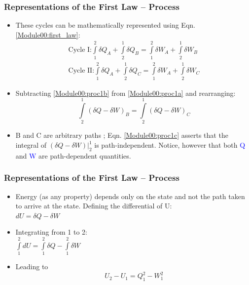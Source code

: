 \documentclass[10pt,compress]{beamer}
\begin{document}
\begin{frame}
 \frametitle{Representations of the First Law -- Process}
   \begin{itemize}
    \item <1-> These cycles can be mathematically represented using Eqn. \ref{Module00:first_law}:
   \begin{eqnarray}
    \text{Cycle I:}  \int\limits_{1}^{2}\delta Q_{A} + \int\limits_{2}^{1}\delta Q_{B} = \int\limits_{1}^{2}\delta W_{A} + \int\limits_{2}^{1}\delta W_{B}  \label{Module00:proc1a}\\
    \text{Cycle II:} \int\limits_{1}^{2}\delta Q_{A} + \int\limits_{2}^{1}\delta Q_{C} = \int\limits_{1}^{2}\delta W_{A} + \int\limits_{2}^{1}\delta W_{C}  \label{Module00:proc1b}
   \end{eqnarray}
   \item <2-> Subtracting \ref{Module00:proc1b} from \ref{Module00:proc1a} and rearranging:
   \begin{equation}
    \int\limits_{2}^{1}\left(\delta Q- \delta W\right)_{B} = \int\limits_{2}^{1}\left(\delta Q- \delta W\right)_{C}\label{Module00:proc1c}
   \end{equation}
   \item <3-> B and C are arbitrary paths ; Eqn. \ref{Module00:proc1c} asserts that the integral of $\left(\delta Q -\delta W\right)\left.\right|_{2}^{1}$ is path-independent. Notice, however that both \textcolor{blue}{Q} and \textcolor{blue}{W} are path-dependent quantities. 
    \end{itemize}
\end{frame}



\begin{frame}
 \frametitle{Representations of the First Law -- Process}

  \begin{itemize}
   \item <1-> Energy (as any property) depends only on the state and not the path taken to arrive at the state. Defining the differential of U:\\
    $dU =\delta Q - \delta W$\\ 
   
   \item <2-> Integrating from 1 to 2:\\
    $\displaystyle\int\limits_{1}^{2}dU =\displaystyle\int\limits_{1}^{2}\delta Q - \displaystyle\int\limits_{1}^{2}\delta W$\\ 

   \item <3-> Leading to
   \begin{equation}
    U_{2} - U_{1} = Q_{1}^{2}- W_{1}^{2} \label{Module00:proc1a}
   \end{equation}

  \end{itemize}
\normalsize
\end{frame}
\end{document}
